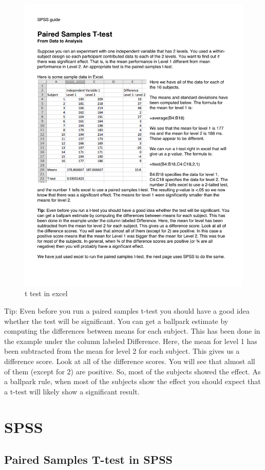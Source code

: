 \begin{figure}
      \includegraphics[width=.7\linewidth]{LabmanualFigures/Excel16.pdf}
      \caption{t test in excel}
      \label{fig:excel16}
\end{figure}
 


Tip: Even before you run a paired samples t-test you should have a good idea whether the test will be significant. You can get a ballpark estimate by computing the differences between means for each subject. This has been done in the example under the column labeled Difference. Here, the mean for level 1 has been subtracted from the mean for level 2 for each subject. This gives us a difference score. Look at all of the difference scores. You will see that almost all of them (except for 2) are positive. So, most of the subjects showed the effect. As a ballpark rule, when most of the subjects show the effect you should expect that a t-test will likely show a significant result.

\section{SPSS}

\subsection{Paired Samples T-test in SPSS} 

